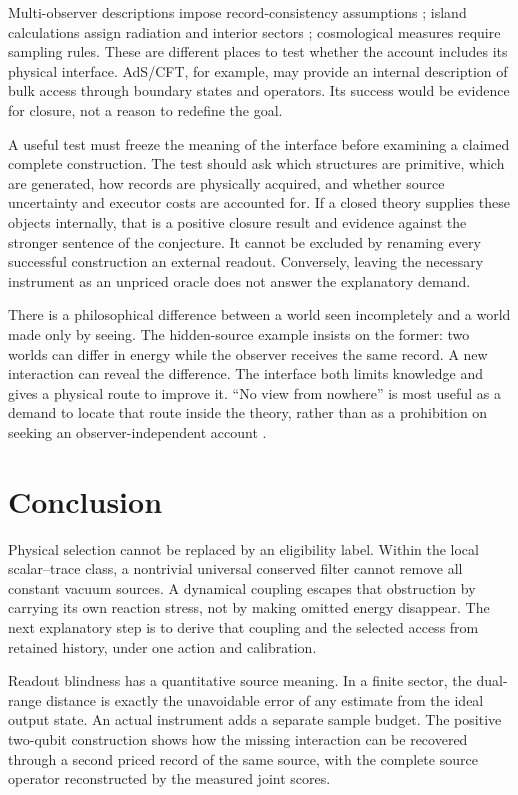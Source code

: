 \documentclass[12pt,a4paper]{article}
\theoremstyle{definition}
\begin{document}
Multi-observer descriptions impose record-consistency assumptions
\cite{Rovelli1996,FrauchigerRenner2018}; island calculations assign
radiation and interior sectors \cite{Penington2020,Almheiri2019};
cosmological measures require sampling rules. These are different places
to test whether the account includes its physical interface. AdS/CFT,
for example, may provide an internal description of bulk access through
boundary states and operators. Its success would be evidence for closure,
not a reason to redefine the goal.

A useful test must freeze the meaning of the interface before examining
a claimed complete construction. The test should ask which structures
are primitive, which are generated, how records are physically acquired,
and whether source uncertainty and executor costs are accounted for.
If a closed theory supplies these objects internally, that is a positive
closure result and evidence against the stronger sentence of the
conjecture. It cannot be excluded by renaming every successful
construction an external readout. Conversely, leaving the necessary
instrument as an unpriced oracle does not answer the explanatory demand.

There is a philosophical difference between a world seen incompletely
and a world made only by seeing. The hidden-source example insists on
the former: two worlds can differ in energy while the observer receives
the same record. A new interaction can reveal the difference. The
interface both limits knowledge and gives a physical route to improve
it. ``No view from nowhere'' is most useful as a demand to locate that
route inside the theory, rather than as a prohibition on seeking an
observer-independent account \cite{Nagel1986}.

\section{Conclusion}

Physical selection cannot be replaced by an eligibility label.
Within the local scalar--trace class, a nontrivial universal conserved
filter cannot remove all constant vacuum sources. A dynamical coupling
escapes that obstruction by carrying its own reaction stress, not by
making omitted energy disappear. The next explanatory step is to
derive that coupling and the selected access from retained history,
under one action and calibration.

Readout blindness has a quantitative source meaning. In a finite sector,
the dual-range distance is exactly the unavoidable error of any estimate
from the ideal output state. An actual instrument adds a separate sample
budget. The positive two-qubit construction shows how the missing
interaction can be recovered through a second priced record of the same
source, with the complete source operator reconstructed by the measured
joint scores.
\end{document}
